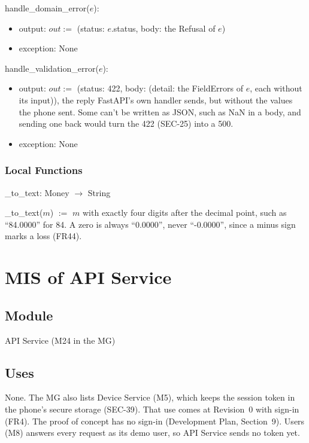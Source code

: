 \documentclass[12pt, titlepage]{article}
\begin{document}
\noindent handle\_domain\_error($e$):
\begin{itemize}
\item output: $out :=$ (status: $e$.status, body: the Refusal of $e$)
\item exception: None
\end{itemize}

\noindent handle\_validation\_error($e$):
\begin{itemize}
\item output: $out :=$ (status: 422, body: (detail: the FieldErrors of $e$,
  each without its input)), the reply FastAPI's own handler sends, but without
  the values the phone sent. Some can't be written as JSON, such as NaN in a
  body, and sending one back would turn the 422 (SEC-25) into a 500.
\item exception: None
\end{itemize}

\subsubsection{Local Functions}

\noindent \_to\_text: Money $\rightarrow$ String

\noindent \_to\_text($m$) $:=$ $m$ with exactly four digits after the decimal
point, such as ``84.0000'' for 84. A zero is always ``0.0000'', never
``-0.0000'', since a minus sign marks a loss (FR44).

\newpage

\section{MIS of API Service} \label{MisAPI}

\subsection{Module}

API Service (M24 in the MG)

\subsection{Uses}

None. The MG also lists Device Service (M5), which keeps the session token in
the phone's secure storage (SEC-39). That use comes at Revision~0 with sign-in
(FR4). The proof of concept has no sign-in (Development Plan, Section~9).
Users (M8) answers every request as its demo user, so API Service sends no
token yet.
\end{document}
